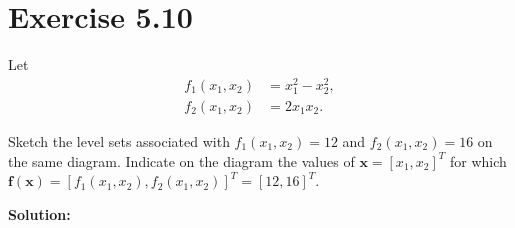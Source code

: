 \documentclass{article}
\begin{document}
\section*{Exercise 5.10}
Let
\begin{align*}
	f_1(x_1,x_2)&=x_1^2-x_2^2,\\
	f_2(x_1,x_2)&=2x_1x_2.
\end{align*}

Sketch the level sets associated with $f_1(x_1,x_2)=12$ and $f_2(x_1,x_2)=16$
on the same diagram. Indicate on the diagram the values of
$\boldsymbol{x}=[x_1,x_2]^T$ for which
$\boldsymbol{f}(\boldsymbol{x})=[f_1(x_1,x_2),f_2(x_1,x_2)]^T=[12,16]^T$.

\textbf{Solution:}
\end{document}
